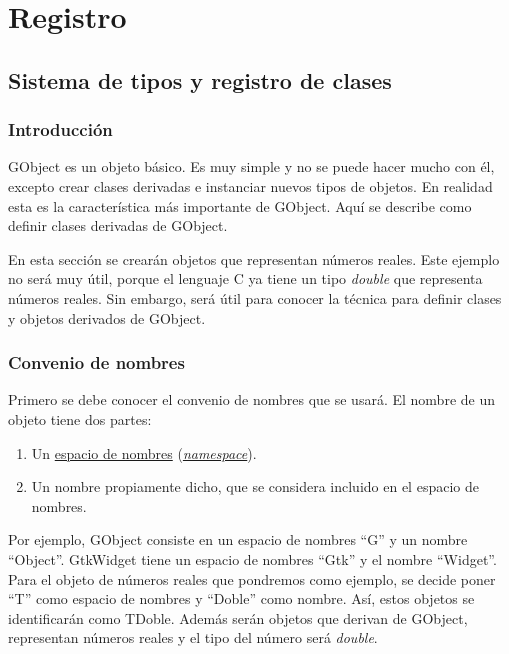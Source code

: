%

\section{Registro}
\subsection{Sistema de tipos y registro de clases} \label{subsec:sistematipos_y_registro}
\subsubsection{Introducción}
\textsf{GObject} es un objeto básico. Es muy simple y no se puede hacer mucho con él, excepto crear
clases derivadas e instanciar nuevos tipos de objetos.
En realidad esta es la característica más importante de \textsf{GObject}.
Aquí se describe como definir clases derivadas de \textsf{GObject}.

En esta sección se crearán objetos que representan números reales. Este ejemplo no será muy útil, porque
el lenguaje C ya tiene un tipo \emph{double} que representa números reales. Sin embargo, será útil para
conocer la técnica para definir clases y objetos derivados de \textsf{GObject}.

\subsubsection{Convenio de nombres}
Primero se debe conocer el convenio de nombres que se usará. El nombre de un objeto tiene dos partes:
\begin{enumerate}
  \tightlist
\item Un \href{https://es.wikipedia.org/wiki/Espacio_de_nombres}{espacio de nombres}
  (\href{https://en.wikipedia.org/wiki/Namespace}{\textit{namespace}}).
\item Un nombre propiamente dicho, que se considera incluido en el espacio de nombres.
\end{enumerate}

Por ejemplo, \textsf{GObject} consiste en un espacio de nombres ``\textsf{G}'' y un nombre ``\textsf{Object}''.
\textsf{GtkWidget} tiene un espacio de nombres ``\textsf{Gtk}'' y el nombre ``\textsf{Widget}''.
Para el objeto de números reales que pondremos como ejemplo, se decide poner ``\textsf{T}'' como espacio
de nombres y ``\textsf{Doble}'' como nombre. Así, estos objetos se identificarán como \textsf{TDoble}.
Además serán objetos que derivan de \textsf{GObject}, representan números reales y el tipo del número
será \textit{double}.

